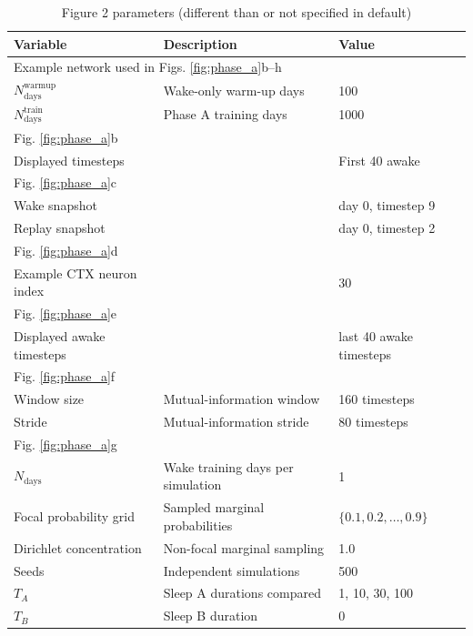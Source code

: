 \documentclass{article}
\begin{document}
\begin{table}[ht]
\centering
\caption{Figure 2 parameters (different than or not specified in default)}
\label{tab:figure_2}
\begin{tabular}{lll}
\toprule
\textbf{Variable} & \textbf{Description} & \textbf{Value} \\
\midrule
\multicolumn{3}{l}{Example network used in Figs. \ref{fig:phase_a}b--h} \\
$N_\textrm{days}^\textrm{warmup}$ & Wake-only warm-up days & 100 \\
$N_\textrm{days}^\textrm{train}$ & Phase A training days & 1000 \\
\midrule
\multicolumn{3}{l}{Fig. \ref{fig:phase_a}b} \\
Displayed timesteps &  & First 40 awake \\
\midrule
\multicolumn{3}{l}{Fig. \ref{fig:phase_a}c} \\
Wake snapshot &  & day 0, timestep 9 \\
Replay snapshot &  & day 0, timestep 2 \\
\midrule
\multicolumn{3}{l}{Fig. \ref{fig:phase_a}d} \\
Example CTX neuron index &  & 30 \\
\midrule
\multicolumn{3}{l}{Fig. \ref{fig:phase_a}e} \\
Displayed awake timesteps &  & last 40 awake timesteps \\
\midrule
\multicolumn{3}{l}{Fig. \ref{fig:phase_a}f} \\
Window size & Mutual-information window & 160 timesteps \\
Stride & Mutual-information stride & 80 timesteps \\
\midrule
\multicolumn{3}{l}{Fig. \ref{fig:phase_a}g} \\
$N_\textrm{days}$ & Wake training days per simulation & 1 \\
Focal probability grid & Sampled marginal probabilities & $\{0.1,0.2,\dots,0.9\}$ \\
Dirichlet concentration & Non-focal marginal sampling & 1.0 \\
Seeds & Independent simulations & 500 \\
$T_A$ & Sleep A durations compared & 1, 10, 30, 100 \\
$T_B$ & Sleep B duration & 0 \\
\bottomrule
\end{tabular}
\end{table}
\end{document}
